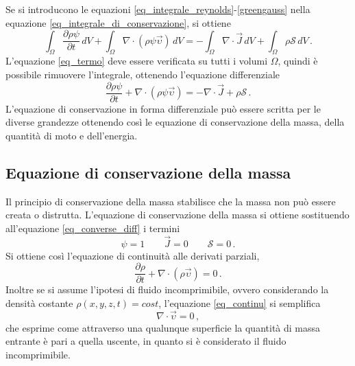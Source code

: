 Se si introducono le equazioni \eqref{eq_integrale_reynolds}-\eqref{greengauss} 
nella equazione \eqref{eq_integrale_di_conservazione}, si ottiene
\begin{equation}
\label{eq_termo}
 \int_{\Omega} \frac{\partial \rho\psi }{\partial t} \, dV + \int_{\Omega} 
\nabla \cdot (\rho\psi\vec{\upsilon})  \, dV = -\int_{\Omega} \nabla \cdot 
\vec{J} \, dV + \int_{\Omega}\rho \mathcal{S} \,dV \,.
\end{equation}
L'equazione \eqref{eq_termo} deve essere verificata su tutti i volumi $\Omega$, 
quindi è possibile rimuovere l'integrale, ottenendo l'equazione differenziale
\begin{equation}
\label{eq_converse_diff}
 \frac{\partial \rho\psi }{\partial t}  +  \nabla \cdot 
(\rho\psi\vec{\upsilon}) 
  = -\nabla \cdot \vec{J}+ \rho \mathcal{S} \,.
\end{equation}
L'equazione di conservazione in forma differenziale può essere scritta per le 
diverse grandezze ottenendo così le equazione di conservazione della massa, 
della quantità di moto e dell'energia.

\subsection{Equazione di conservazione della massa}
Il principio di conservazione della massa stabilisce che la massa non può 
essere 
creata o distrutta. L'equazione di conservazione della massa si ottiene 
sostituendo all'equazione \eqref{eq_converse_diff} i termini
\begin{equation}
\psi=1 \qquad \vec{J}=0 \qquad \mathcal{S}=0 \,.
\end{equation}
Si ottiene così l'equazione di continuità alle derivati parziali,
\begin{equation}
\label{eq_continu}
\frac{\partial \rho}{\partial t} + \nabla \cdot (\rho \vec{\upsilon}) = 0 \,.
\end{equation}
Inoltre se si assume l'ipotesi di fluido incomprimibile, ovvero considerando la 
densità costante $\rho(x,y,z,t)=cost$, l'equazione \eqref{eq_continu} si 
semplifica 
\begin{equation}
\label{..}
\nabla \cdot \vec{\upsilon} = 0 \,,
\end{equation}
che esprime come attraverso una qualunque superficie la quantità di massa 
entrante è pari a quella uscente, in quanto si è considerato il fluido 
incomprimibile.

